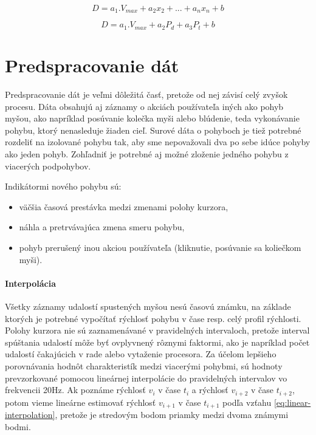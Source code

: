 \begin{equation}
D = a_{1}.V_{max} + a_{2}x_{2} + ... + a_{n}x_{n} + b
\label{eq:multiple-linear-regression}
\end{equation}

\begin{equation}
D = a_{1}.V_{max} + a_{2}P_{d} + a_{3}P_{t} + b
\label{eq:multiple-regresion-conrete}
\end{equation}

\section{Predspracovanie dát}
Predspracovanie dát je veľmi dôležitá časť, pretože od nej závisí celý zvyšok procesu. Dáta obsahujú aj záznamy o akciách používateľa iných ako pohyb myšou, ako napríklad posúvanie kolečka myši alebo blúdenie, teda vykonávanie pohybu, ktorý nenasleduje žiaden cieľ. Surové dáta o pohyboch je tiež potrebné rozdeliť na izolované pohybu tak, aby sme nepovažovali dva po sebe idúce pohyby ako jeden pohyb. Zohľadniť je potrebné aj možné zloženie jedného pohybu z viacerých podpohybov. 

Indikátormi nového pohybu sú:
\begin{itemize}
\item väčšia časová prestávka medzi zmenami polohy kurzora,
\item náhla a pretrvávajúca zmena smeru pohybu,
\item pohyb prerušený inou akciou používateľa (kliknutie, posúvanie sa koliečkom myši).
\end{itemize}

\paragraph*{Interpolácia} Všetky záznamy udalostí spustených myšou nesú časovú známku, na základe ktorých je potrebné vypočítať rýchlosť pohybu v čase resp. celý profil rýchlosti. Polohy kurzora nie sú zaznamenávané v pravidelných intervaloch, pretože interval spúštania udalostí môže byť ovplyvnený rôznymi faktormi, ako je napríklad počet udalostí čakajúcich v rade alebo vytaženie procesora. Za účelom lepšieho porovnávania hodnôt charakteristík medzi viacerými pohybmi, sú hodnoty prevzorkované pomocou lineárnej interpolácie do pravidelných intervalov vo frekvencii 20Hz. Ak poznáme rýchlosť \emph{$v_{i}$} v čase \emph{$t_{i}$}  a rýchlosť \emph{$v_{i+2}$} v čase \emph{$t_{i+2}$}, potom vieme lineárne estimovať rýchlosť \emph{$v_{i+1}$} v čase \emph{$t_{i+1}$} podľa vzťahu \ref{eq:linear-interpolation}, pretože je stredovým bodom priamky medzi dvoma známymi bodmi.

